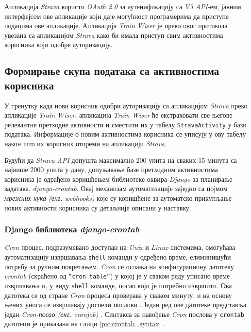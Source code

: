 \documentclass[12pt,oneside]{memoir}
\begin{document}
Апликација \textit{Strava} користи \textit{OAuth 2.0} \cite{strava_api_oauth2} за аутенификацију са \textit{V3 API}-ем, 
јавним интерфејсом ове апликације који даје могућност програмерима да приступе подацима ове апликације. Апликација \textit{Train Wiser} је преко овог протокола увезана са апликацијом \textit{Strava} како би имала приступ свим активностима корисника који одобре ауторизацију. 


\subsection{Формирање скупа података са активностима корисника}\label{subsec:activities_dataset}

У тренутку када нови корисник одобри ауторизацију са апликацијом \textit{Strava} преко апликације \textit{Train Wiser}, апликација \textit{Train Wiser} ће екстраховати све његове релевантне претходне активности и сместити их у табелу \texttt{StravaActivity} у бази података. Информације о новим активностима корисника се уписују у ову табелу након што их корисних отпреми на апликацији \textit{Strava}.

Будући да \textit{Strava API} допушта максимално 200 упита на сваких 15 минута са највише 2000 упита у дану, допуњавање базе претходним активностима корисника је одрађено коришћењем библиотеке оквира \textit{Django} за планирање задатака, \textit{django-crontab}.
Овај механизам аутоматизације заједно са појмом \textit{мрежних кука (енг. webhooks)} које су коришћене за аутоматско прикупљање нових активности корисника су детаљније описани у наставку.

\subsubsection{Django библиотека \textit{django-crontab}}

\textit{Cron} процес, подразумевано доступан на \textit{Unix} и \textit{Linux} системима, омогућава аутоматизацију извршавања \texttt{shell} команди у одређено време, елиминишући потребу за ручним покретањем. \textit{Cron} се ослања на конфигурациону датотеку \textit{crontab} (скраћено од \texttt{''cron table''}) у којој је у сваком реду уписано време извршавања и, у виду \texttt{shell} команде, посао који је потребно извршити. Ова датотека се од стране \textit{Cron} процеса проверава у сваком минуту, и на основу њених уноса се извршавају доспели послови \cite{linux_pocket_guide}. Један ред ове датотеке представља један \textit{Cron-посао (енг. cronjob)} \cite{cronjob}.
Синтакса за навођење \textit{Cron} послова у \texttt{crontab} датотеци је приказана на слици \ref{pic:crontab_syntax} \cite{linux_pocket_guide}.
\end{document}

